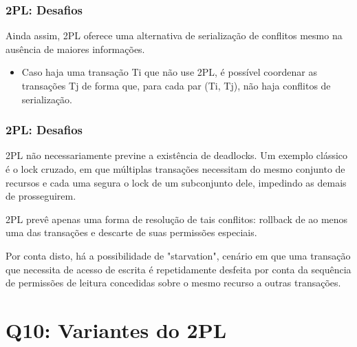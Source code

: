 \documentclass{beamer}
\begin{document}

\begin{frame}
    \frametitle{2PL: Desafios}

    Ainda assim, 2PL oferece uma alternativa de serialização de conflitos mesmo na ausência de maiores informações. 

    \begin{itemize}
        \item Caso haja uma transação Ti que não use 2PL, é possível coordenar as transações Tj de forma que, para cada par (Ti, Tj), não haja conflitos de serialização.
    \end{itemize}
\end{frame}


\begin{frame}
    \frametitle{2PL: Desafios}

    2PL não necessariamente previne a existência de deadlocks. Um exemplo clássico é o lock cruzado, em que múltiplas transações necessitam do mesmo conjunto de recursos e cada uma segura o lock de um subconjunto dele, impedindo as demais de prosseguirem.

    2PL prevê apenas uma forma de resolução de tais conflitos: rollback de ao menos uma das transações e descarte de suas permissões especiais.

    Por conta disto, há a possibilidade de "starvation", cenário em que uma transação que necessita de acesso de escrita é repetidamente desfeita por conta da sequência de permissões de leitura concedidas sobre o mesmo recurso a outras transações.

\end{frame}

\section{Q10: Variantes do 2PL}
\end{document}
